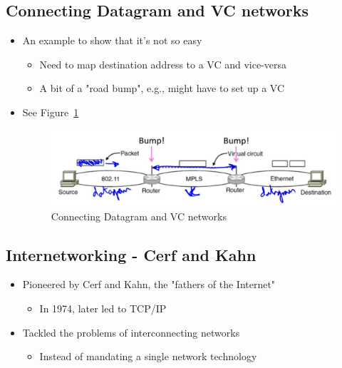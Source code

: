 \documentclass[12pt]{ctexart}   %
\begin{document}
	\subsection{Connecting Datagram and VC networks}
	\begin{itemize}
		\item An example to show that it's not so easy
		\begin{itemize}
			\item Need to map destination address to a VC and vice-versa
			\item A bit of a "road bump", e.g., might have to set up a VC
		\end{itemize}
		\item See Figure~\ref{fig:4-3-1}
		
		\begin{figure}[h!] %
		\centering
		 \includegraphics[scale=0.7]{images/4-3-1}
		\caption{ Connecting Datagram and VC networks }
		 \label{fig:4-3-1}
		 \end{figure}
	\end{itemize}
	
	\subsection{Internetworking - Cerf and Kahn}
	\begin{itemize}
		\item Pioneered by Cerf and Kahn, the "fathers of the Internet"
		\begin{itemize}
			\item In 1974, later led to TCP/IP
		\end{itemize}
		
		\item Tackled the problems of interconnecting networks
		\begin{itemize}
			\item Instead of mandating a single network technology
		\end{itemize}
	\end{itemize}
	
\end{document}
